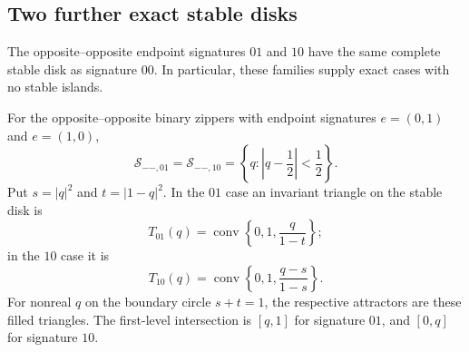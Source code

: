 \subsection{Two further exact stable disks}
\label{subsec:oo01-oo10-exact-disk}

The opposite--opposite endpoint signatures $01$ and $10$ have the
same complete stable disk as signature $00$. In particular, these
families supply exact cases with no stable islands.

\begin{theorem}
\label{thm:oo01-oo10-stable-disks}
For the opposite--opposite binary zippers with endpoint signatures
$e=(0,1)$ and $e=(1,0)$,
\[
 \mathcal S_{--,01}=\mathcal S_{--,10}
 =\left\{q:\left|q-\frac12\right|<\frac12\right\}.
\]
Put $s=|q|^2$ and $t=|1-q|^2$. In the $01$ case an invariant
triangle on the stable disk is
\[
 T_{01}(q)=\operatorname{conv}\left\{0,1,\frac{q}{1-t}\right\};
\]
in the $10$ case it is
\[
 T_{10}(q)=\operatorname{conv}\left\{0,1,\frac{q-s}{1-s}\right\}.
\]
For nonreal $q$ on the boundary circle $s+t=1$, the respective
attractors are these filled triangles. The first-level intersection
is $[q,1]$ for signature $01$, and $[0,q]$ for signature $10$.
\end{theorem}
